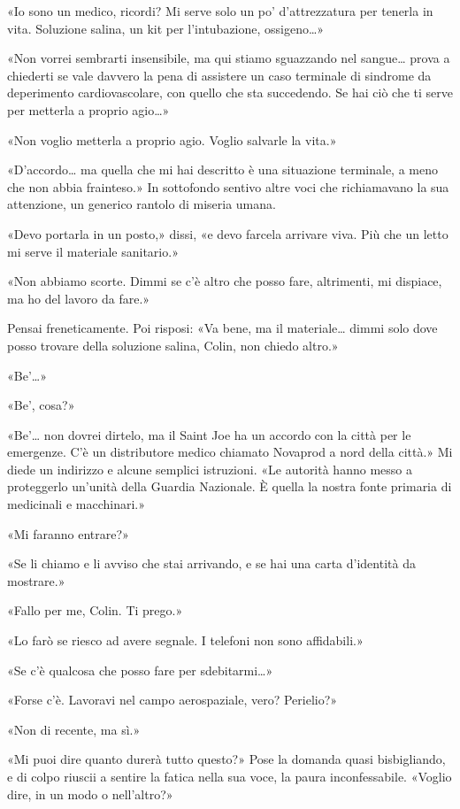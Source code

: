 «Io sono un medico, ricordi? Mi serve solo un po' d'attrezzatura per
tenerla in vita. Soluzione salina, un kit per l'intubazione,
ossigeno\ldots»

«Non vorrei sembrarti insensibile, ma qui stiamo sguazzando nel
sangue\ldots{} prova a chiederti se vale davvero la pena di assistere un
caso terminale di sindrome da deperimento cardiovascolare, con quello
che sta succedendo. Se hai ciò che ti serve per metterla a proprio
agio\ldots»

«Non voglio metterla a proprio agio. Voglio salvarle la vita.»

«D'accordo\ldots{} ma quella che mi hai descritto è una situazione
terminale, a meno che non abbia frainteso.» In sottofondo sentivo altre
voci che richiamavano la sua attenzione, un generico rantolo di miseria
umana.

«Devo portarla in un posto,» dissi, «e devo farcela arrivare viva. Più
che un letto mi serve il materiale sanitario.»

«Non abbiamo scorte. Dimmi se c'è altro che posso fare, altrimenti, mi
dispiace, ma ho del lavoro da fare.»

Pensai freneticamente. Poi risposi: «Va bene, ma il materiale\ldots{}
dimmi solo dove posso trovare della soluzione salina, Colin, non chiedo
altro.»

«Be'\ldots»

«Be', cosa?»

«Be'\ldots{} non dovrei dirtelo, ma il Saint Joe ha un accordo con la
città per le emergenze. C'è un distributore medico chiamato Novaprod a
nord della città.» Mi diede un indirizzo e alcune semplici istruzioni.
«Le autorità hanno messo a proteggerlo un'unità della Guardia Nazionale.
È quella la nostra fonte primaria di medicinali e macchinari.»

«Mi faranno entrare?»

«Se li chiamo e li avviso che stai arrivando, e se hai una carta
d'identità da mostrare.»

«Fallo per me, Colin. Ti prego.»

«Lo farò se riesco ad avere segnale. I telefoni non sono affidabili.»

«Se c'è qualcosa che posso fare per sdebitarmi\ldots»

«Forse c'è. Lavoravi nel campo aerospaziale, vero? Perielio?»

«Non di recente, ma sì.»

«Mi puoi dire quanto durerà tutto questo?» Pose la domanda quasi
bisbigliando, e di colpo riuscii a sentire la fatica nella sua voce, la
paura inconfessabile. «Voglio dire, in un modo o nell'altro?»

